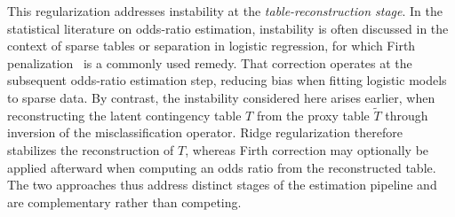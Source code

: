 \documentclass[pdflatex,sn-mathphys-num]{sn-jnl}%
\theoremstyle{thmstyleone}%
\theoremstyle{thmstyletwo}%
\theoremstyle{thmstylethree}%
\begin{document}
This regularization addresses instability at the \emph{table-reconstruction stage}. In the statistical literature on odds-ratio estimation, instability is often discussed in the context of sparse tables or separation in logistic regression, for which Firth penalization~\cite{firth1993bias} is a commonly used remedy. That correction operates at the subsequent odds-ratio estimation step, reducing bias when fitting logistic models to sparse data.
%
By contrast, the instability considered here arises earlier, when reconstructing the latent contingency table $T$ from the proxy table $\tilde T$ through inversion of the misclassification operator. Ridge regularization therefore stabilizes the reconstruction of $T$, whereas Firth correction may optionally be applied afterward when computing an odds ratio from the reconstructed table. The two approaches thus address distinct stages of the estimation pipeline and are complementary rather than competing.
\end{document}
